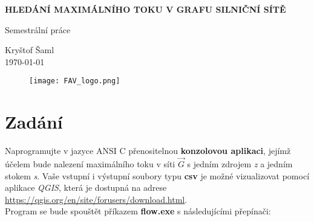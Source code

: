 \documentclass[12pt,a4paper]{article}
\begin{document}
	\begin{titlepage}
		\begin{center}
			\Huge
			\textbf{HLEDÁNÍ MAXIMÁLNÍHO TOKU V GRAFU SILNIČNÍ SÍTĚ} \\
			
			\bigskip  \bigskip
			
			
			\huge
			Semestrální práce
			\
			
			\bigskip
			\Large{Kryštof Šaml} \\
			\bigskip
			\today
			
			\begin{figure}[h]
				
				\centering
				\texttt{[image: FAV\_logo.png]}
				\label{overflow}
				
				
			\end{figure}
		\end{center}
	\end{titlepage}
	\newpage
	\tableofcontents
	\newpage
	
	\section{Zadání}
	Naprogramujte v jazyce ANSI C přenositelnou \textbf{konzolovou aplikaci}, jejímž účelem bude nalezení maximálního toku v síti $\vec{G}$ s jedním zdrojem \textit{z} a jedním stokem \textit{s}. Vaše vstupní i výstupní soubory typu \textbf{csv} je možné vizualizovat pomocí aplikace \textit{QGIS}, která je dostupná na adrese \\[\baselineskip] \url{https://qgis.org/en/site/forusers/download.html}.\\[\baselineskip] Program se bude spouštět příkazem \textbf{flow.exe} s následujícími přepínači:
\end{document}
